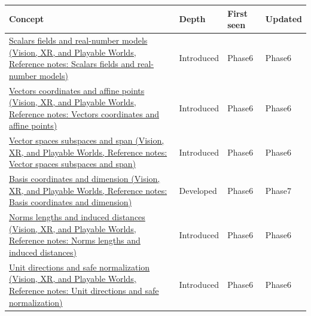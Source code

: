 {\def\LTcaptype{none} %
\begin{longtable}[]{@{}
  >{\raggedright\arraybackslash}p{}
  >{\raggedright\arraybackslash}p{}
  >{\raggedright\arraybackslash}p{}
  >{\raggedright\arraybackslash}p{}@{}}
\toprule\noalign{}
\begin{minipage}[b]{\linewidth}\raggedright
Concept
\end{minipage} & \begin{minipage}[b]{\linewidth}\raggedright
Depth
\end{minipage} & \begin{minipage}[b]{\linewidth}\raggedright
First seen
\end{minipage} & \begin{minipage}[b]{\linewidth}\raggedright
Updated
\end{minipage} \\
\midrule\noalign{}
\endhead
\bottomrule\noalign{}
\endlastfoot
\href{../07-Vision-XR-and-Playable-Worlds/main.pdf\#nameddest=appendix-52051ad550fe}{Scalars fields and real-number models (Vision, XR, and Playable Worlds, Reference notes: Scalars fields and real-number models)} & Introduced & Phase6 & Phase6 \\
\href{../07-Vision-XR-and-Playable-Worlds/main.pdf\#nameddest=appendix-0659864c0aa3}{Vectors coordinates and affine points (Vision, XR, and Playable Worlds, Reference notes: Vectors coordinates and affine points)} & Introduced & Phase6 & Phase6 \\
\href{../07-Vision-XR-and-Playable-Worlds/main.pdf\#nameddest=appendix-173b52c063ae}{Vector spaces subspaces and span (Vision, XR, and Playable Worlds, Reference notes: Vector spaces subspaces and span)} & Introduced & Phase6 & Phase6 \\
\href{../07-Vision-XR-and-Playable-Worlds/main.pdf\#nameddest=appendix-ce0341f7ea0d}{Basis coordinates and dimension (Vision, XR, and Playable Worlds, Reference notes: Basis coordinates and dimension)} & Developed & Phase6 & Phase7 \\
\href{../07-Vision-XR-and-Playable-Worlds/main.pdf\#nameddest=appendix-49933872bb51}{Norms lengths and induced distances (Vision, XR, and Playable Worlds, Reference notes: Norms lengths and induced distances)} & Introduced & Phase6 & Phase6 \\
\href{../07-Vision-XR-and-Playable-Worlds/main.pdf\#nameddest=appendix-f744e41b95b4}{Unit directions and safe normalization (Vision, XR, and Playable Worlds, Reference notes: Unit directions and safe normalization)} & Introduced & Phase6 & Phase6 \\

\end{longtable}}
